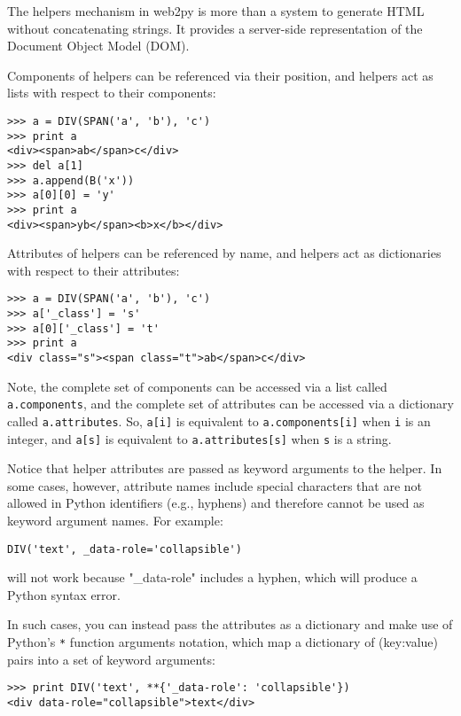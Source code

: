 \documentclass[justified,sixbynine,notoc]{tufte-book}
\def\ft{\small\tt}
\def\inxx#1{\index{#1}}
\begin{document}
\begin{fullwidth}
\inxx{Document Object Model (DOM)}
The helpers mechanism in web2py is more than a system to generate HTML without concatenating strings. It provides a server-side representation of the Document Object Model (DOM).

Components of helpers can be referenced via their position, and helpers act as lists with respect to their components:
\begin{lstlisting}
>>> a = DIV(SPAN('a', 'b'), 'c')
>>> print a
<div><span>ab</span>c</div>
>>> del a[1]
>>> a.append(B('x'))
>>> a[0][0] = 'y'
>>> print a
<div><span>yb</span><b>x</b></div>
\end{lstlisting}

Attributes of helpers can be referenced by name, and helpers act as dictionaries with respect to their attributes:
\begin{lstlisting}
>>> a = DIV(SPAN('a', 'b'), 'c')
>>> a['_class'] = 's'
>>> a[0]['_class'] = 't'
>>> print a
<div class="s"><span class="t">ab</span>c</div>
\end{lstlisting}

Note, the complete set of components can be accessed via a list called {\ft a.components}, and the complete set of attributes can be accessed via a dictionary called {\ft a.attributes}. So, {\ft a[i]} is equivalent to {\ft a.components[i]} when {\ft i} is an integer, and {\ft a[s]} is equivalent to {\ft a.attributes[s]} when {\ft s} is a string.

Notice that helper attributes are passed as keyword arguments to the helper. In some cases, however, attribute names include special characters that are not allowed in Python identifiers (e.g., hyphens) and therefore cannot be used as keyword argument names. For example:

\begin{lstlisting}
DIV('text', _data-role='collapsible')
\end{lstlisting}
\noindent will not work because "\_data-role" includes a hyphen, which will produce a Python syntax error.

In such cases, you can instead pass the attributes as a dictionary and make use of Python's {\ft **} function arguments notation, which map a dictionary of (key:value) pairs into a set of keyword arguments:

\begin{lstlisting}
>>> print DIV('text', **{'_data-role': 'collapsible'})
<div data-role="collapsible">text</div>
\end{lstlisting}


\end{fullwidth}
\end{document}
